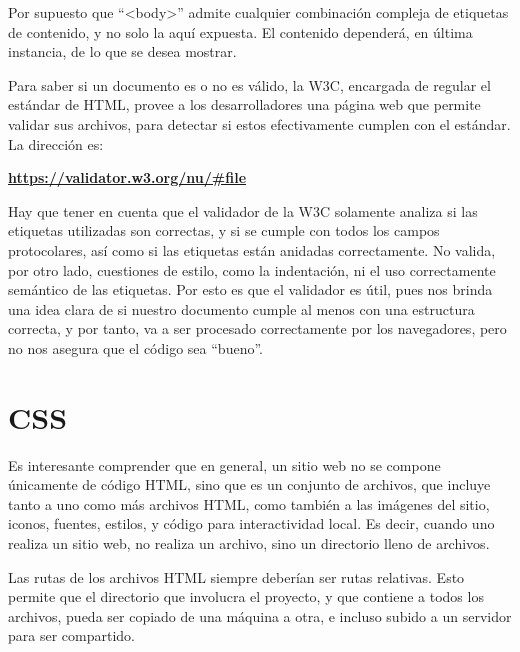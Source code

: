 Por supuesto que ``<body>'' admite cualquier combinación compleja de etiquetas
de contenido, y no solo la aquí expuesta. El contenido dependerá, en última
instancia, de lo que se desea mostrar.

Para saber si un documento es o no es válido, la W3C, encargada de regular
el estándar de HTML, provee a los desarrolladores una página web que permite
validar sus archivos, para detectar si estos efectivamente cumplen con el
estándar. La dirección es:

\textbf{\href{https://validator.w3.org/nu/\#file}{https://validator.w3.org/nu/\#file}}

Hay que tener en cuenta que el validador de la W3C solamente analiza si las
etiquetas utilizadas son correctas, y si se cumple con todos los campos
protocolares, así como si las etiquetas están anidadas correctamente. No valida,
por otro lado, cuestiones de estilo, como la indentación, ni el uso correctamente
semántico de las etiquetas. Por esto es que el validador es útil, pues nos brinda
una idea clara de si nuestro documento cumple al menos con una estructura
correcta, y por tanto, va a ser procesado correctamente por los navegadores,
pero no nos asegura que el código sea ``bueno''.

\section{CSS}

Es interesante comprender que en general, un sitio web no se compone únicamente
de código HTML, sino que es un conjunto de archivos, que incluye tanto a uno
como más archivos HTML, como también a las imágenes del sitio, iconos, fuentes,
estilos, y código para interactividad local. Es decir, cuando uno realiza un
sitio web, no realiza un archivo, sino un directorio lleno de archivos.

Las rutas de los archivos HTML siempre deberían ser rutas relativas. Esto
permite que el directorio que involucra el proyecto, y que contiene a todos
los archivos, pueda ser copiado de una máquina a otra, e incluso subido a un
servidor para ser compartido.

